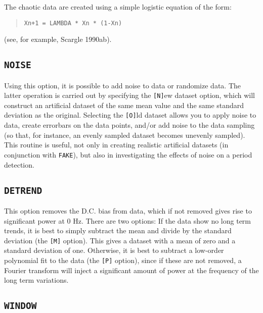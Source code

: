 The chaotic data are created using a simple logistic equation of the form:

\begin{quote}
{\tt Xn+1 = LAMBDA * Xn * (1-Xn)}
\end{quote}

(see, for example, Scargle 1990ab).

\subsection*{\tt NOISE}

Using this option, it is possible to add noise to data or randomize data. The
latter operation is carried out by specifying the {\tt [N]}ew dataset option,
which will construct an artificial dataset of the same mean value and the same
standard deviation as the original. Selecting the {\tt [O]}ld dataset allows
you to apply noise to data, create errorbars on the data points, and/or add
noise to the data sampling (so that, for instance, an evenly sampled dataset
becomes unevenly sampled). This routine is useful, not only in creating
realistic artificial datasets (in conjunction with {\tt FAKE}), but also in
investigating the effects of noise on a period detection.

\subsection*{\tt DETREND}

This option removes the D.C. bias from data, which if not removed gives rise to
significant power at 0 Hz. There are two options: If the data show no long term
trends, it is best to simply subtract the mean and divide by the standard
deviation (the {\tt [M]} option). This gives a dataset with a mean of zero and
a standard deviation of one. Otherwise, it is best to subtract a low-order
polynomial fit to the data (the {\tt [P]} option), since if these are not
removed, a Fourier transform will inject a significant amount of power at the
frequency of the long term variations.

\subsection*{\tt WINDOW}

